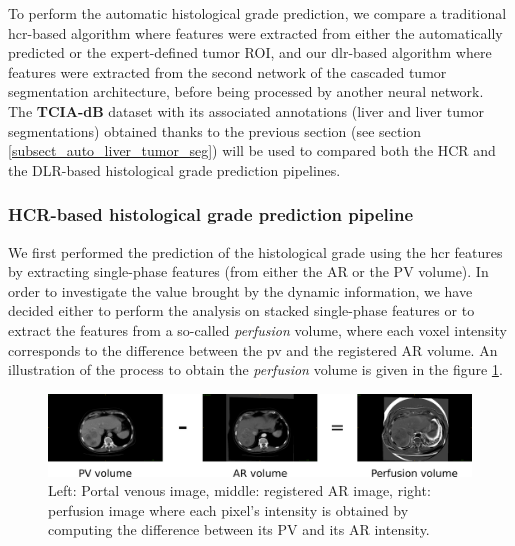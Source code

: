 \documentclass[]{article}
\newcommand{\lmttfont}[1]{{\fontfamily{lmtt}\selectfont #1}}
\begin{document}
To perform the automatic histological grade prediction, we compare a traditional \ac{hcr}-based algorithm where features were extracted from either the automatically predicted or the expert-defined tumor ROI, and our \ac{dlr}-based algorithm where features were extracted from the second network of the cascaded tumor segmentation architecture, before being processed by another neural network.\\
The \textbf{\lmttfont{TCIA-dB}} dataset with its associated annotations (liver and liver tumor segmentations) obtained thanks to the previous section (see section \ref{subsect_auto_liver_tumor_seg}) will be used to compared both the HCR and the DLR-based histological grade prediction pipelines.


\subsubsection{HCR-based histological grade prediction pipeline}\label{hcr-based_method}

We first performed the prediction of the histological grade using the \ac{hcr} features by extracting single-phase features (from either the AR or the PV volume).
In order to investigate the value brought by the dynamic information, we have decided either to perform the analysis on stacked single-phase features or to extract the features from a so-called \textit{perfusion} volume, where each voxel intensity corresponds to the difference between the \ac{pv} and the registered AR volume. An illustration of the process to obtain the \textit{perfusion} volume is given in the figure \ref{fig:perfusion}.

\begin{figure}
	\centering
	\includegraphics[width=0.9\linewidth]{../Contributions/images/perfusion}
	\caption{Left: Portal venous image, middle: registered AR image, right: perfusion image where each pixel's intensity is obtained by computing the difference between its PV and its AR intensity.}
	\label{fig:perfusion}
\end{figure}
\end{document}
